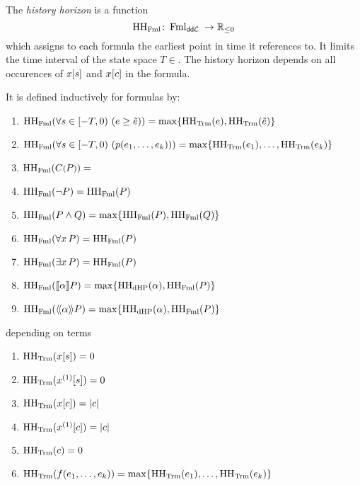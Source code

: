         \begin{definition}
            The \emph{history horizon} is a function
            \begin{equation*}
                \operatorname{HH_{\operatorname{Fml}}}\colon \operatorname{Fml}_{\textsf{dd{\kern-0.1em}$\mathcal{L}$ }} \to \mathbb{R}_{\leq 0}
            \end{equation*}
            which assigns to each \ddL formula the earliest point in time it references to. It limits the time interval of the state space $T\in$.
            The history horizon depends on all occurences of $x[s]$ and $x[c]$ in the formula.

            It is defined inductively for formulas by:
            \begin{enumerate}
                \item $\HHfml(\holdssince{-T}{\astrm\geq\bstrm}) = \max\set{\HHtrm(\astrm),\HHtrm(\bstrm)}$
                \item $\HHfml(\holdssince{-T}{p(\range{\istrm{1}}{\istrm{k}})}) = \max\set{\range{\HHtrm(\istrm{1})}{\HHtrm(\istrm{k})}}$
                \item $\operatorname{HH_{\operatorname{Fml}}}(C\text{\footnotesize$($}P\text{\footnotesize$)$}) = $
                \item $\operatorname{HH_{\operatorname{Fml}}}(\lnot P) = \operatorname{HH_{\operatorname{Fml}}}(P)$
                \item $\HHfml(\asfml\land\bsfml) = \max\set{\HHfml(\asfml),\HHfml(\bsfml)}$
                \item $\operatorname{HH_{\operatorname{Fml}}}(\forall x{\,} P) = \operatorname{HH_{\operatorname{Fml}}}(P)$
                \item $\operatorname{HH_{\operatorname{Fml}}}(\exists x{\,} P) = \operatorname{HH_{\operatorname{Fml}}}(P)$
                \item $\HHfml(\dbox{\asprg}{\asfml}) = \max\set{\HHprg(\asprg),\HHfml(\asfml)}$
                \item $\HHfml(\ddiamond{\asprg}{\asfml}) = \max\set{\HHprg(\asprg),\HHfml(\asfml)}$
            \end{enumerate}
            depending on terms
            \begin{enumerate}
                \item $\operatorname{HH_{\operatorname{Trm}}}(x[s]) = 0$
                \item $\HHtrm(\Dx[s]) = 0$
                \item $\operatorname{HH_{\operatorname{Trm}}}(x[c]) = \lvert c\rvert$
                \item $\HHtrm(\Dx[c]) = \abs{c}$
                \item $\operatorname{HH_{\operatorname{Trm}}}(c) = 0$
                \item $\HHtrm(f(\range{\istrm{1}}{\istrm{k}})) = \max\set{\range{\HHtrm(\istrm{1})}{\HHtrm(\istrm{k})}}$

\end{enumerate}
\end{definition}

